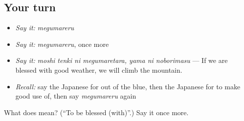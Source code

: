 \subsection*{Your turn}
\begin{itemize}
\raggedright
  \item \emph{Say it:} \emph{megumareru}
  \item \emph{Say it:} \emph{megumareru}, once more
  \item \emph{Say it:} \emph{moshi tenki ni megumaretara, yama ni noborimasu} — If we are blessed with good weather, we will climb the mountain.
  \item \emph{Recall:} say the Japanese for out of the blue, then the Japanese for to make good use of, then say \emph{megumareru} again
\end{itemize}

\begin{tcolorbox}[breakable,colback=teal!4,colframe=teal!35!black,title={Before you move on}]
What does  mean? (\textquotedblleft{}To be blessed (with)\textquotedblright{}.) Say it once more.
\end{tcolorbox}
